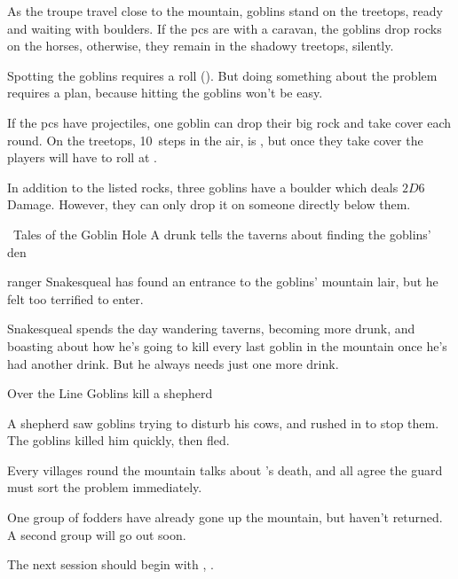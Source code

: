 As the troupe travel close to the mountain, goblins stand on the treetops, ready and waiting with boulders.
If the \glspl{pc} are with a caravan, the goblins drop rocks on the horses, otherwise, they remain in the shadowy treetops, silently.

Spotting the goblins requires a  roll (\tn[10]).
But doing something about the problem requires a plan, because hitting the goblins won't be easy.

If the \glspl{pc} have \glspl{projectile}, one goblin can drop their big rock and take cover each \gls{round}.
On the treetops, 10~\glspl{step} in the air, is \tn[9], but once they take cover the players will have to roll at \tn[11].

\goblin

In addition to the listed rocks, three goblins have a boulder which deals $2D6$ Damage.
However, they can only drop it on someone directly below them.

{\squash~Tales of the Goblin Hole}%
{A drunk  tells the taverns about finding the goblins' den}%

\begin{exampletext}
  \Gls{ranger} Snakesqueal has found an entrance to the goblins' mountain lair, but he felt too terrified to enter.
\end{exampletext}

Snakesqueal spends the day wandering taverns, becoming more drunk, and boasting about how he's going to kill every last goblin in the mountain once he's had another drink.
But he always needs just one more drink.

{Over the Line}%
{Goblins kill a shepherd}%

\begin{exampletext}
  A shepherd saw goblins trying to disturb his cows, and rushed in to stop them.
  The goblins killed him quickly, then fled.
\end{exampletext}

Every \glspl{village} round the mountain talks about \composeHumanName's death, and all agree the \gls{guard} must sort the problem immediately.

One group of \glspl{fodder} have already gone up the mountain, but haven't returned.
A second group will go out soon.

The next session should begin with , .
